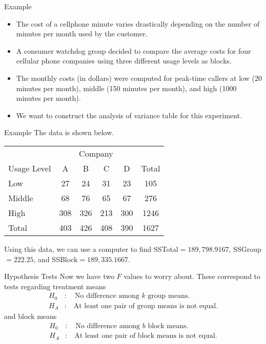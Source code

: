 \begin{frame}{Example}
    \begin{itemize}
        \item The cost of a cellphone minute varies drastically depending on the number of minutes per month used by the customer.
        \item A consumer watchdog group decided to compare the average costs for four cellular phone companies using three different usage levels as blocks.
        \item The monthly costs (in dollars) were computed for peak-time callers at low (20 minutes per month), middle (150 minutes per month), and high (1000 minutes per month).
        \item We want to construct the analysis of variance table for this experiment.
    \end{itemize}
\end{frame}

\begin{frame}{Example}
    The data is shown below.
    \begin{table}[h]
        \centering
        \begin{tabular}{l ccccc}
             & \multicolumn{4}{c}{Company} & \\
             \cline{2-5}
            Usage Level & A & B & C & D & Total \\ 
            \hline
            Low & 27 & 24 & 31 & 23 & 105 \\
            Middle & 68 & 76 & 65 & 67 & 276 \\
            High & 308 & 326 & 213 & 300 & 1246 \\
            \hline
            Total & 403 & 426 & 408 & 390 & 1627 \\
        \end{tabular}
    \end{table}
    Using this data, we can use a computer to find SSTotal$ = 189,798.9167$, SSGroup$= 222.25$, and SSBlock$= 189,335.1667$. 
\end{frame}

\begin{frame}{Hypothesis Tests}
    Now we have two $F$ values to worry about. These correspond to tests regarding treatment means
    \begin{align*}
       H_0&: \quad \text{No difference among } k \text{ group means.} \\
       H_A&: \quad \text{At least one pair of group means is not equal.}
    \end{align*}
    and block means
    \begin{align*}
        H_0&: \quad \text{No difference among } b \text{ block means.} \\
        H_A&: \quad \text{At least one pair of block means is not equal.}
    \end{align*}
\end{frame}


